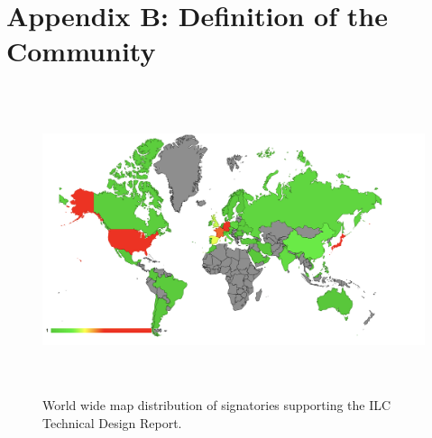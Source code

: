 \documentclass[%
 reprint,
 amsmath,amssymb,
 aps,
]{revtex4-1}
\begin{document}

\newpage

\section*{\label{Appendix2} \Large{Appendix B: Definition of the Community}} 
\begin{figure}[h]
 \begin{center}
 \includegraphics[width=\hsize,height=9cm]{figures/WorldSignatoriesTDR.png}
\caption{World wide map distribution of signatories supporting the ILC Technical Design Report. \label{TDRsignatories}}
 \end{center}
 \end{figure}
 
\end{document}
